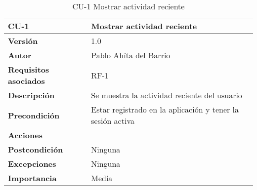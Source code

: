 \begin{table}[p]
	\centering
	\begin{tabularx}{\linewidth}{ p{} p{} }
		\toprule
		\textbf{CU-1}    & \textbf{Mostrar actividad reciente}\\
		\toprule
		\textbf{Versión}              & 1.0    \\
		\textbf{Autor}                & Pablo Ahíta del Barrio \\
		\textbf{Requisitos asociados} & RF-1 \\
		\textbf{Descripción}          & Se muestra la actividad reciente del usuario \\
		\textbf{Precondición}         & Estar registrado en la aplicación y tener la sesión activa \\
		\textbf{Acciones}             &
		\\
		\textbf{Postcondición}        & Ninguna \\
		\textbf{Excepciones}          & Ninguna \\
		\textbf{Importancia}          & Media \\
		\bottomrule
	\end{tabularx}
	\caption{CU-1 Mostrar actividad reciente}
\end{table}

